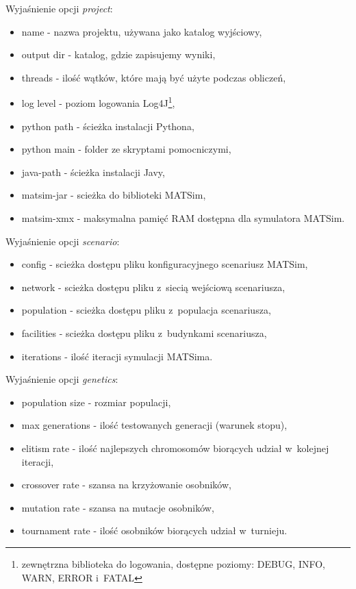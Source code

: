 \documentclass[twoside,12pt]{report}
\begin{document}
Wyjaśnienie opcji \textit{project}:
\begin{itemize}
\item name - nazwa projektu, używana jako katalog wyjściowy,
\item output dir - katalog, gdzie zapisujemy wyniki,
\item threads - ilość wątków, które mają być użyte podczas obliczeń,
\item log level - poziom logowania Log4J\footnote{zewnętrzna biblioteka do logowania, dostępne poziomy: DEBUG, INFO, WARN, ERROR i~FATAL},
\item python path - ścieżka instalacji Pythona,
\item python main - folder ze skryptami pomocniczymi,
\item java-path - ścieżka instalacji Javy,
\item matsim-jar - scieżka do biblioteki MATSim,
\item matsim-xmx - maksymalna pamięć RAM dostępna dla symulatora MATSim.
\end{itemize}

\vspace*{15px}

Wyjaśnienie opcji \textit{scenario}:
\begin{itemize}
\item config - scieżka dostępu pliku konfiguracyjnego scenariusz MATSim,
\item network - scieżka dostępu pliku z~siecią wejściową scenariusza,
\item population - scieżka dostępu pliku z~populacja scenariusza,
\item facilities - scieżka dostępu pliku z~budynkami scenariusza,
\item iterations - ilość iteracji symulacji MATSima.
\end{itemize}

\vspace*{15px}

Wyjaśnienie opcji \textit{genetics}:
\begin{itemize}
\item population size - rozmiar populacji,
\item max generations - ilość testowanych generacji (warunek stopu),
\item elitism rate - ilość najlepszych chromosomów biorących udział w~kolejnej iteracji,
\item crossover rate - szansa na krzyżowanie osobników,
\item mutation rate - szansa na mutacje osobników,
\item tournament rate - ilość osobników biorących udział w~turnieju.
\end{itemize}
\end{document}
